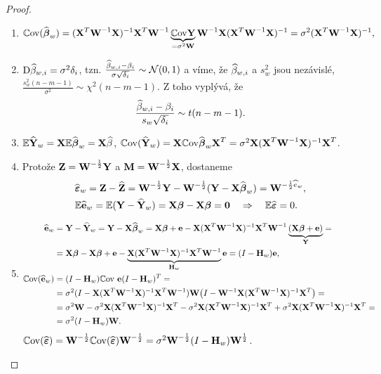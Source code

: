 \begin{theorem}
\begin{proof}
	\begin{enumerate}[1)]
		\item $$\mathbb{C}\mathrm{ov} (\widehat{\boldsymbol{\beta}}_w)={(\textbf{X}^T{\textbf{W}^{-1}}\textbf{X})^{-1}}\textbf{X}^T{\textbf{W}^{-1}}\underbrace{\mathbb{C}\mathrm{ov} \textbf{Y}}_{=\sigma^2\textbf{W}}{\textbf{W}^{-1}}\textbf{X}{(\textbf{X}^T{\textbf{W}^{-1}}\textbf{X})^{-1}}=\sigma^2{(\textbf{X}^T{\textbf{W}^{-1}}\textbf{X})^{-1}},$$
		\item $\mathrm{D} \widehat{\beta}_{w,i}=\sigma^2\delta_i$, tzn. $\frac{\widehat{\beta}_{w,i}-\beta_i}{\sigma\sqrt{\delta_i}}\sim\mathcal{N}(0,1)$ a víme, že $\widehat{\beta}_{w,i}$ a $s_w^2$ jsou nezávislé, $\frac{s_w^2(n-m-1)}{\sigma^2}\sim\chi^2(n-m-1)$. Z toho vyplývá, že 
		$$ \frac{\widehat{\beta}_{w,i}-\beta_i}{s_w\sqrt{\delta_i}}\sim t(n-m-1).$$
		\item $\mathbb{E} \widehat{\textbf{Y}}_w=\textbf{X}\mathbb{E} \widehat{\boldsymbol{\beta}}_w=\textbf{X}\widehat{\beta}$, $\mathbb{C}\mathrm{ov}(\widehat{\textbf{Y}}_w)=\textbf{X}\mathbb{C}\mathrm{ov}\widehat{\boldsymbol{\beta}}_w \textbf{X}^T=\sigma^2\textbf{X}{(\textbf{X}^T{\textbf{W}^{-1}}\textbf{X})^{-1}}\textbf{X}^T$.
		\item Protože $\textbf{Z}=\textbf{W}^{-\frac{1}{2}}\textbf{Y}$ a $\textbf{M}=\textbf{W}^{-\frac{1}{2}}\textbf{X}$, dostaneme 
		\[
		\begin{split}
		& \widehat{\boldsymbol{\varepsilon}}_w=\textbf{Z}-\widehat{\textbf{Z}}=\textbf{W}^{-\frac{1}{2}}\textbf{Y}-\textbf{W}^{-\frac{1}{2}}(\textbf{Y}-\textbf{X}\widehat{\boldsymbol{\beta}}_w)=\textbf{W}^{-\frac{1}{2}\widehat{e}_w},\\
		& \mathbb{E} \widehat{\textbf{e}}_w=\mathbb{E}(\textbf{Y}-\widehat{\textbf{Y}}_w)=\textbf{X}\boldsymbol{\beta}-\textbf{X}\boldsymbol{\beta}=\textbf{0}\quad\Rightarrow\quad \mathbb{E} \widehat{\boldsymbol{\varepsilon}}=0.
		\end{split}
		\]
		\item \[
		\begin{split}
		\widehat{\textbf{e}}_w&=\textbf{Y}-\widehat{\textbf{Y}}_w=\textbf{Y}-\textbf{X}\widehat{\boldsymbol{\beta}}_w=\textbf{X}\boldsymbol{\beta}+\textbf{e}-\textbf{X}{(\textbf{X}^T{\textbf{W}^{-1}}\textbf{X})^{-1}}\textbf{X}^T{\textbf{W}^{-1}}\underbrace{(\textbf{X}\boldsymbol{\beta}+\textbf{e})}_{\textbf{Y}}=\\&=\textbf{X}\boldsymbol{\beta}-\textbf{X}\boldsymbol{\beta}+\textbf{e}-\underbrace{\textbf{X}{(\textbf{X}^T{\textbf{W}^{-1}}\textbf{X})^{-1}}\textbf{X}^T{\textbf{W}^{-1}}}_{\textbf{H}_w}\textbf{e}=(I-\textbf{H}_w)\textbf{e},\\
		\mathbb{C}\mathrm{ov}(\widehat{\textbf{e}}_w)&=(I-\textbf{H}_w)\mathbb{C}\mathrm{ov}~ \textbf{e}(I-\textbf{H}_w)^T=\\&=\sigma^2(I-\textbf{X}{(\textbf{X}^T{\textbf{W}^{-1}}\textbf{X})^{-1}}\textbf{X}^T{\textbf{W}^{-1}})\textbf{W}\big(I-{\textbf{W}^{-1}}\textbf{X}{(\textbf{X}^T{\textbf{W}^{-1}}\textbf{X})^{-1}}\textbf{X}^T\big)=\\&=\sigma^2\textbf{W}-\sigma^2\textbf{X}{(\textbf{X}^T{\textbf{W}^{-1}}\textbf{X})^{-1}}\textbf{X}^T-\sigma^2\textbf{X}{(\textbf{X}^T{\textbf{W}^{-1}}\textbf{X})^{-1}}\textbf{X}^T
+\sigma^2\textbf{X}{(\textbf{X}^T{\textbf{W}^{-1}}\textbf{X})^{-1}}\textbf{X}^T=\\&=\sigma^2(I-\textbf{H}_w)\textbf{W}.	\end{split}
		\]
		$\mathbb{C}\mathrm{ov}(\widehat{\boldsymbol{\varepsilon}})=\textbf{W}^{-\frac{1}{2}}\mathbb{C}\mathrm{ov}(\widehat{\boldsymbol{\varepsilon}})\textbf{W}^{-\frac{1}{2}}=\sigma^2\textbf{W}^{-\frac{1}{2}}(I-\textbf{H}_w)\textbf{W}^{\frac{1}{2}}$.
	\end{enumerate}
\end{proof}
\end{theorem}

